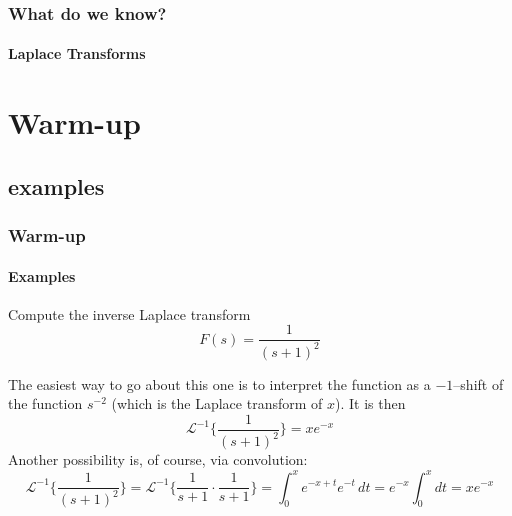 \documentclass[9pt,xcolor=x11names,compress]{beamer}
\newcommand*\iBLaplace[1]{\mathcal{L}^{-1}\Big\{{#1}\Big\}}
\begin{document}
\begin{frame}\frametitle{What do we know?}
\framesubtitle{Laplace Transforms}

\noindent{}
\end{frame}

\section{Warm-up}
\subsection{examples}

\begin{frame}\frametitle{Warm-up}
\framesubtitle{Examples}
\begin{block}
{Compute the inverse Laplace transform}
\begin{equation*}
	F(s)=\frac{1}{(s+1)^2}	
\end{equation*}
\end{block}
\pause The easiest way to go about this one is to interpret the function as a $-1$--shift of the function $s^{-2}$ (which is the Laplace transform of $x$).  It is then
\begin{equation*}
	\iBLaplace{\frac{1}{(s+1)^2}} = xe^{-x}
\end{equation*}
\pause Another possibility is, of course, via convolution:
\begin{equation*}
	\iBLaplace{\frac{1}{(s+1)^2}} = \iBLaplace{\frac{1}{s+1}\cdot \frac{1}{s+1}} =  \int_0^x e^{-x+t}e^{-t}\, dt = e^{-x}\int_0^x dt = xe^{-x}
\end{equation*}
\end{frame}
\end{document}
